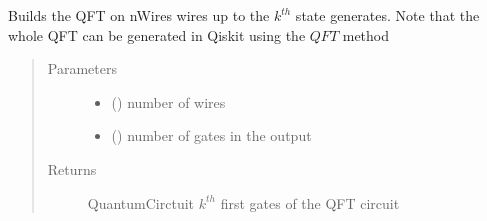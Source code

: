 \documentclass[letterpaper,10pt,english]{sphinxmanual}
\begin{document}

\begin{fulllineitems}
\label{\detokenize{QFT:mermin_on_qiskit.QFT.all_QFT_circuits}}
\end{fulllineitems}


\begin{fulllineitems}
\label{\detokenize{QFT:mermin_on_qiskit.QFT.build_QFT_0_to_k}}
Builds the QFT on nWires wires up to the \(k^{th}\) state generates.
Note that the whole QFT can be generated in Qiskit using the \(QFT\) method
\begin{quote}\begin{description}
\item[{Parameters}] \leavevmode\begin{itemize}
\item {} 
 () \textendash{} number of wires

\item {} 
 () \textendash{} number of gates in the output

\end{itemize}

\item[{Returns}] \leavevmode
QuantumCirctuit \textendash{} \(k^{th}\) first gates of the QFT circuit

\end{description}\end{quote}

\end{fulllineitems}

\end{document}
